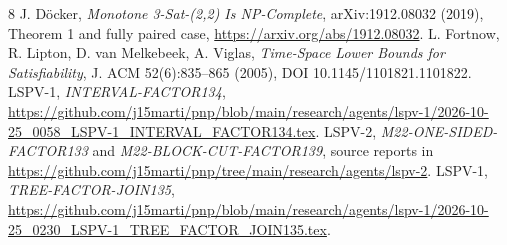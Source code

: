 \documentclass[11pt]{article}
\begin{document}
\begin{thebibliography}{8}
 J. D\"ocker, \emph{Monotone 3-Sat-(2,2) Is NP-Complete}, arXiv:1912.08032 (2019), Theorem 1 and fully paired case, \url{https://arxiv.org/abs/1912.08032}.
 L. Fortnow, R. Lipton, D. van Melkebeek, A. Viglas, \emph{Time-Space Lower Bounds for Satisfiability}, J. ACM 52(6):835--865 (2005), DOI 10.1145/1101821.1101822.
 LSPV-1, \emph{INTERVAL-FACTOR134}, \url{https://github.com/j15marti/pnp/blob/main/research/agents/lspv-1/2026-10-25_0058_LSPV-1_INTERVAL_FACTOR134.tex}.
 LSPV-2, \emph{M22-ONE-SIDED-FACTOR133} and \emph{M22-BLOCK-CUT-FACTOR139}, source reports in \url{https://github.com/j15marti/pnp/tree/main/research/agents/lspv-2}.
 LSPV-1, \emph{TREE-FACTOR-JOIN135}, \url{https://github.com/j15marti/pnp/blob/main/research/agents/lspv-1/2026-10-25_0230_LSPV-1_TREE_FACTOR_JOIN135.tex}.
\end{thebibliography}
\end{document}
